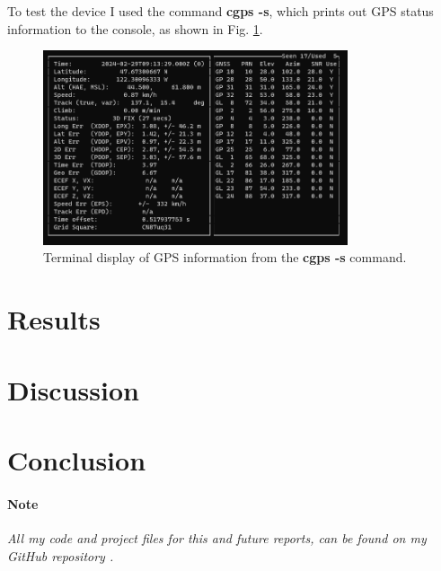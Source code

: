 \documentclass[12pt]{article}
\begin{document}
To test the device I used the command \textbf{cgps -s}, which prints out GPS status information to the console, as shown in Fig. \ref{fig:cgps}.

\begin{figure}[h]
\centering
\includegraphics[width=0.8\textwidth]{cgps.png} %
\caption{Terminal display of GPS information from the \textbf{cgps -s} command.}
\label{fig:cgps}
\end{figure}

\section{Results}\label{sec:results}

\section{Discussion}\label{sec:discussion}

\section{Conclusion}\label{sec:conclusion}

\paragraph{Note}
\textit{All my code and project files for this and future reports, can be found on my GitHub repository \cite{lybbert2024classwork}.}



\end{document}
